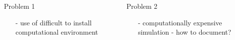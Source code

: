 \begin{frame}{}
  \begin{columns}
    \begin{column}{.5\textwidth}
      \minipage[c][0.65\textheight][s]{\columnwidth}
      \begin{center}
      Problem 1        
      \end{center}


      \begin{itemize}[leftmargin=*]
        
      \item[-] use of difficult to install computational environment
        
      \end{itemize}

      
      
      \endminipage      
    \end{column}
    \begin{column}{.5\textwidth}
            \minipage[c][0.65\textheight][s]{\columnwidth}

      Problem 2
      \begin{itemize}[leftmargin=*]
        
      \item[-] computationally expensive simulation - how to document?
        
      \end{itemize}

      \endminipage            
      
    \end{column}
  \end{columns}  
\end{frame}
